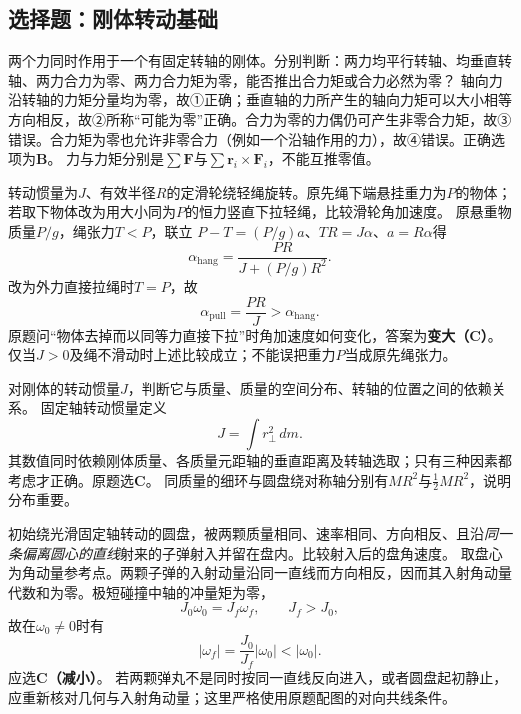 \subsection{选择题：刚体转动基础}

\problemtext 两个力同时作用于一个有固定转轴的刚体。分别判断：两力均平行转轴、均垂直转轴、两力合力为零、两力合力矩为零，能否推出合力矩或合力必然为零？
\workings
轴向力沿转轴的力矩分量均为零，故①正确；垂直轴的力所产生的轴向力矩可以大小相等方向相反，故②所称“可能为零”正确。合力为零的力偶仍可产生非零合力矩，故③错误。合力矩为零也允许非零合力（例如一个沿轴作用的力），故④错误。正确选项为\textbf{B}。
\crosscheck 力与力矩分别是$\sum\bm F$与$\sum\bm r_i\times\bm F_i$，不能互推零值。

\problemtext 转动惯量为$J$、有效半径$R$的定滑轮绕轻绳旋转。原先绳下端悬挂重力为$P$的物体；若取下物体改为用大小同为$P$的恒力竖直下拉轻绳，比较滑轮角加速度。
\workings
原悬重物质量$P/g$，绳张力$T<P$，联立
$P-T=(P/g)a$、$TR=J\alpha$、$a=R\alpha$得
\[
\alpha_{\mathrm{hang}}=\frac{PR}{J+(P/g)R^2}.
\]
改为外力直接拉绳时$T=P$，故
\[
\alpha_{\mathrm{pull}}=\frac{PR}{J}>\alpha_{\mathrm{hang}}.
\]
原题问“物体去掉而以同等力直接下拉”时角加速度如何变化，答案为\textbf{变大（C）}。
\crosscheck 仅当$J>0$及绳不滑动时上述比较成立；不能误把重力$P$当成原先绳张力。

\problemtext 对刚体的转动惯量$J$，判断它与质量、质量的空间分布、转轴的位置之间的依赖关系。
\workings
固定轴转动惯量定义
\[
J=\int r_\perp^2\,dm.
\]
其数值同时依赖刚体质量、各质量元距轴的垂直距离及转轴选取；只有三种因素都考虑才正确。原题选\textbf{C}。
\crosscheck 同质量的细环与圆盘绕对称轴分别有$MR^2$与$\frac12MR^2$，说明分布重要。

\problemtext 初始绕光滑固定轴转动的圆盘，被两颗质量相同、速率相同、方向相反、且沿\emph{同一条偏离圆心的直线}射来的子弹射入并留在盘内。比较射入后的盘角速度。
\workings
取盘心为角动量参考点。两颗子弹的入射动量沿同一直线而方向相反，因而其入射角动量代数和为零。极短碰撞中轴的冲量矩为零，
\[
J_0\omega_0=J_f\omega_f,\qquad J_f>J_0,
\]
故在$\omega_0\ne0$时有
\[
\boxed{|\omega_f|=\frac{J_0}{J_f}|\omega_0|<|\omega_0|}.
\]
应选\textbf{C（减小）}。
\crosscheck 若两颗弹丸不是同时按同一直线反向进入，或者圆盘起初静止，应重新核对几何与入射角动量；这里严格使用原题配图的对向共线条件。

